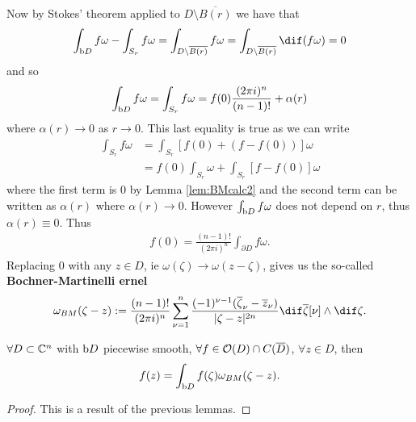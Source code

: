 Now by Stokes' theorem applied to $D \setminus \overline{B(r)}$ we have that
\begin{align*}
    \int_{\bdy D} f \omega - \int_{S_r} f \omega = \int_{D \setminus \overline{B(r)}} f \omega = \int_{D \setminus \overline{B(r)}} \dif (f \omega) = 0
\end{align*}
and so
\begin{align*}
    \int_{\operatorname{b}\! D} f \omega = \int_{S_r } f \omega = f(0) \frac{(2 \pi i)^n}{(n-1)!} + \alpha(r)
\end{align*}
where $\alpha(r) \to 0$ as $r \to 0$. This last equality is true as we can write
\begin{align*}
    \int_{S_r} f \omega &= \int_{S_r} \left[ f(0) + (f - f(0)) \right] \omega\\
    &= f(0) \int_{S_r} \omega+ \int_{S_r} \left[ f-f(0) \right] \omega
\end{align*}
where the first term is $0$ by Lemma \ref{lem:BMcalc2} and the second term can be written as $\alpha(r)$ where $\alpha(r) \to 0$. However $\int_{\operatorname{b}\! D} f \omega$ does not depend on $r$, thus $\alpha(r) \equiv 0$. Thus
\begin{align*}
    f(0) = \frac{(n-1)!}{(2 \pi i)^n} \int_{\partial D} f \omega.
\end{align*}
Replacing $0$ with any $z \in D$, ie $\omega(\zeta) \to \omega(z - \zeta)$, gives us the so-called \textbf{Bochner-Martinelli ernel}
\begin{align*}
    \omega_{BM} (\zeta - z) : = \frac{(n-1)!}{(2 \pi i )^n} \sum_{\nu = 1}^n \frac{(-1)^{\nu-1} (\overline{\zeta}_{\nu} -\zz_\nu)}{|\zeta - z|^{2n}} \dif \overline{\zeta} [\nu] \wedge \dif \zeta.
\end{align*}

\begin{theorem}
    $\forall D \subset \mathbb{C}^n$ with $\operatorname{b}\! D$ piecewise smooth, $\forall  f \in \mathcal{O} (D) \cap C(\overline{D})$, $\forall z \in D$, then
    \begin{align}\label{eq:BM}
        f(z) = \int_{\operatorname{b}\! D} f(\zeta) \omega_{BM}(\zeta - z).
    \end{align}
\end{theorem}
\begin{proof}
    This is a result of the previous lemmas.
\end{proof}

